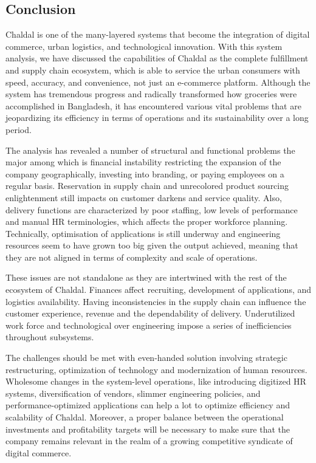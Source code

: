 \documentclass[12pt,a4paper]{article}
\begin{document}
\subsection{Conclusion}

Chaldal is one of the many-layered systems that become the integration of digital commerce, urban logistics, and technological innovation. With this system analysis, we have discussed the capabilities of Chaldal as the complete fulfillment and supply chain ecosystem, which is able to service the urban consumers with speed, accuracy, and convenience, not just an e-commerce platform. Although the system has tremendous progress and radically transformed how groceries were accomplished in Bangladesh, it has encountered various vital problems that are jeopardizing its efficiency in terms of operations and its sustainability over a long period.

The analysis has revealed a number of structural and functional problems the major among which is financial instability restricting the expansion of the company geographically, investing into branding, or paying employees on a regular basis. Reservation in supply chain and unrecolored product sourcing enlightenment still impacts on customer darkens and service quality. Also, delivery functions are characterized by poor staffing, low levels of performance and manual HR terminologies, which affects the proper workforce planning. Technically, optimisation of applications is still underway and engineering resources seem to have grown too big given the output achieved, meaning that they are not aligned in terms of complexity and scale of operations.

These issues are not standalone as they are intertwined with the rest of the ecosystem of Chaldal. Finances affect recruiting, development of applications, and logistics availability. Having inconsistencies in the supply chain can influence the customer experience, revenue and the dependability of delivery. Underutilized work force and technological over engineering impose a series of inefficiencies throughout subsystems.

The challenges should be met with even-handed solution involving strategic restructuring, optimization of technology and modernization of human resources. Wholesome changes in the system-level operations, like introducing digitized HR systems, diversification of vendors, slimmer engineering policies, and performance-optimized applications can help a lot to optimize efficiency and scalability of Chaldal. Moreover, a proper balance between the operational investments and profitability targets will be necessary to make sure that the company remains relevant in the realm of a growing competitive syndicate of digital commerce.
\end{document}
